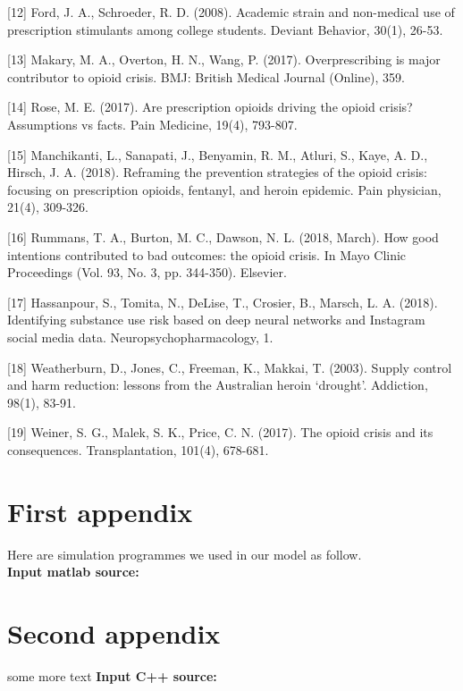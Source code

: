 \documentclass{mcmthesis}
\begin{document}
[12] Ford, J. A., Schroeder, R. D. (2008). Academic strain and non-medical use of prescription stimulants among college students. Deviant Behavior, 30(1), 26-53.

[13] Makary, M. A., Overton, H. N., Wang, P. (2017). Overprescribing is major contributor to opioid crisis. BMJ: British Medical Journal (Online), 359.

[14] Rose, M. E. (2017). Are prescription opioids driving the opioid crisis? Assumptions vs facts. Pain Medicine, 19(4), 793-807.

[15] Manchikanti, L., Sanapati, J., Benyamin, R. M., Atluri, S., Kaye, A. D., Hirsch, J. A. (2018). Reframing the prevention strategies of the opioid crisis: focusing on prescription opioids, fentanyl, and heroin epidemic. Pain physician, 21(4), 309-326.

[16] Rummans, T. A., Burton, M. C.,  Dawson, N. L. (2018, March). How good intentions contributed to bad outcomes: the opioid crisis. In Mayo Clinic Proceedings (Vol. 93, No. 3, pp. 344-350). Elsevier.

[17] Hassanpour, S., Tomita, N., DeLise, T., Crosier, B.,  Marsch, L. A. (2018). Identifying substance use risk based on deep neural networks and Instagram social media data. Neuropsychopharmacology, 1.

[18] Weatherburn, D., Jones, C., Freeman, K., Makkai, T. (2003). Supply control and harm reduction: lessons from the Australian heroin ‘drought’. Addiction, 98(1), 83-91.

[19] Weiner, S. G., Malek, S. K., Price, C. N. (2017). The opioid crisis and its consequences. Transplantation, 101(4), 678-681.

\newpage



\begin{appendices}


\newpage
\section{First appendix}

\lipsum[13]

Here are simulation programmes we used in our model as follow.\\

\textbf{\textcolor[rgb]{0.98,0.00,0.00}{Input matlab source:}}


\section{Second appendix}

some more text \textcolor[rgb]{0.98,0.00,0.00}{\textbf{Input C++ source:}}


\end{appendices}
\end{document}

